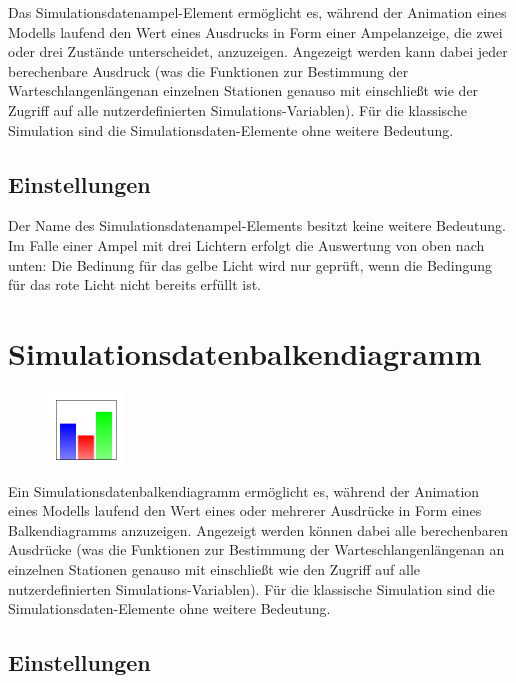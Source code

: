 Das Simulationsdatenampel-Element ermöglicht es, während der Animation eines Modells laufend den Wert
eines Ausdrucks in Form einer Ampelanzeige, die zwei oder drei Zustände unterscheidet, anzuzeigen.
Angezeigt werden kann dabei jeder berechenbare Ausdruck (was die Funktionen zur Bestimmung der
Warteschlangenlängenan einzelnen Stationen genauso mit einschließt wie der Zugriff auf alle nutzerdefinierten
Simulations-Variablen). Für die klassische Simulation sind die Simulationsdaten-Elemente ohne weitere Bedeutung.

\subsection*{Einstellungen}

Der Name des Simulationsdatenampel-Elements besitzt keine weitere Bedeutung. Im Falle einer Ampel mit drei
Lichtern erfolgt die Auswertung von oben nach unten: Die Bedinung für das gelbe Licht wird nur geprüft,
wenn die Bedingung für das rote Licht nicht bereits erfüllt ist.


\section{Simulationsdatenbalkendiagramm}
\label{ref:ModelElementAnimationBarChart}

\begin{figure}
\vspace{-22pt}
\includegraphics[width=2cm]{imageModelElementAnimationBarChart.png}
\vspace{-22pt}
\end{figure}

Ein Simulationsdatenbalkendiagramm ermöglicht es, während der Animation eines Modells laufend den Wert
eines oder mehrerer Ausdrücke in Form eines Balkendiagramms anzuzeigen.
Angezeigt werden können dabei alle berechenbaren Ausdrücke (was die Funktionen zur Bestimmung der
Warteschlangenlängenan an einzelnen Stationen genauso mit einschließt wie den Zugriff auf alle
nutzerdefinierten Simulations-Variablen). Für die klassische Simulation sind die
Simulationsdaten-Elemente ohne weitere Bedeutung.

\subsection*{Einstellungen}

